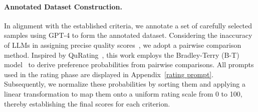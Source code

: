 \documentclass[11pt]{article}
\begin{document}
\paragraph{Annotated Dataset Construction.} 
In alignment with the established criteria, we annotate a set of carefully selected samples using GPT-4 to form the annotated dataset. Considering the inaccuracy of LLMs in assigning precise quality scores~\citep{zheng2024judging}, we adopt a pairwise comparison method. Inspired by QuRating~\citep{wettig2024qurating}, this work employs the Bradley-Terry (B-T) model~\citep{bradley1952rank} to derive preference probabilities from pairwise comparisons. All prompts used in the rating phase are displayed in Appendix~\ref{rating prompt}.
Subsequently, we normalize these probabilities by sorting them and applying a linear transformation to map them onto a uniform rating scale from 0 to 100, thereby establishing the final scores for each criterion. 


\end{document}
